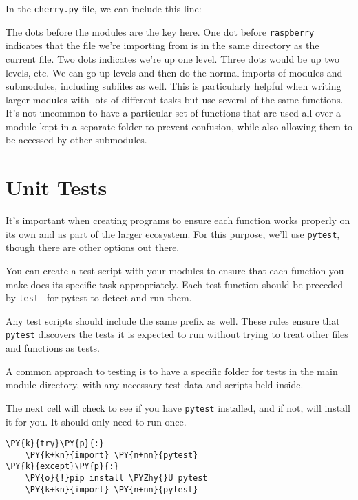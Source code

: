 In the \texttt{cherry.py} file, we can include this line:

\begin{Shaded}
\begin{Highlighting}[]
\end{Highlighting}
\end{Shaded}

The dots before the modules are the key here. One dot before
\texttt{raspberry} indicates that the file we're importing from is in
the same directory as the current file. Two dots indicates we're up one
level. Three dots would be up two levels, etc. We can go up levels and
then do the normal imports of modules and submodules, including subfiles
as well. This is particularly helpful when writing larger modules with
lots of different tasks but use several of the same functions. It's not
uncommon to have a particular set of functions that are used all over a
module kept in a separate folder to prevent confusion, while also
allowing them to be accessed by other submodules.
\section{Unit Tests}
It's important when creating programs to ensure each function works
properly on its own and as part of the larger ecosystem. For this
purpose, we'll use \texttt{pytest}, though there are other options out
there.

You can create a test script with your modules to ensure that each
function you make does its specific task appropriately. Each test
function should be preceded by \texttt{test\_} for pytest to detect and
run them.

Any test scripts should include the same prefix as well. These rules
ensure that \texttt{pytest} discovers the tests it is expected to run
without trying to treat other files and functions as tests.

A common approach to testing is to have a specific folder for tests in
the main module directory, with any necessary test data and scripts held
inside.

The next cell will check to see if you have \texttt{pytest} installed,
and if not, will install it for you. It should only need to run once.

    \begin{tcolorbox}[breakable, size=fbox, boxrule=1pt, pad at break*=1mm,colback=cellbackground, colframe=cellborder]
\begin{Verbatim}[commandchars=\\\{\}]
\PY{k}{try}\PY{p}{:}
    \PY{k+kn}{import} \PY{n+nn}{pytest}
\PY{k}{except}\PY{p}{:}
    \PY{o}{!}pip install \PYZhy{}U pytest
    \PY{k+kn}{import} \PY{n+nn}{pytest}
\end{Verbatim}
\end{tcolorbox}

